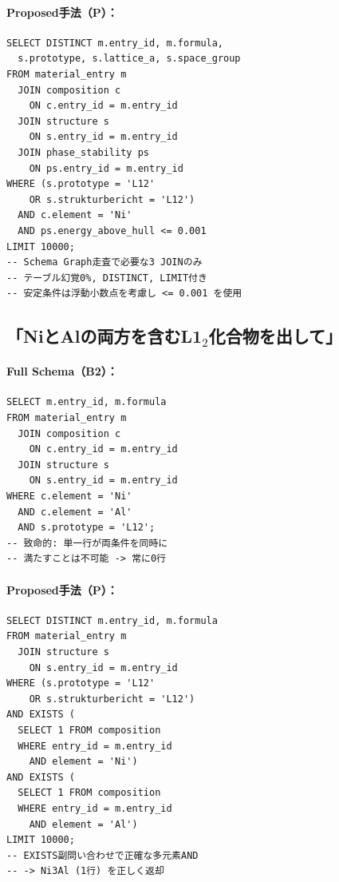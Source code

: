\documentclass[5p,twocolumn]{elsarticle}
\begin{document}
\paragraph{Proposed手法（P）：}
\begin{lstlisting}
SELECT DISTINCT m.entry_id, m.formula,
  s.prototype, s.lattice_a, s.space_group
FROM material_entry m
  JOIN composition c
    ON c.entry_id = m.entry_id
  JOIN structure s
    ON s.entry_id = m.entry_id
  JOIN phase_stability ps
    ON ps.entry_id = m.entry_id
WHERE (s.prototype = 'L12'
    OR s.strukturbericht = 'L12')
  AND c.element = 'Ni'
  AND ps.energy_above_hull <= 0.001
LIMIT 10000;
-- Schema Graph走査で必要な3 JOINのみ
-- テーブル幻覚0%, DISTINCT, LIMIT付き
-- 安定条件は浮動小数点を考慮し <= 0.001 を使用
\end{lstlisting}

\subsection{「NiとAlの両方を含むL1$_2$化合物を出して」}

\paragraph{Full Schema（B2）：}
\begin{lstlisting}
SELECT m.entry_id, m.formula
FROM material_entry m
  JOIN composition c
    ON c.entry_id = m.entry_id
  JOIN structure s
    ON s.entry_id = m.entry_id
WHERE c.element = 'Ni'
  AND c.element = 'Al'
  AND s.prototype = 'L12';
-- 致命的: 単一行が両条件を同時に
-- 満たすことは不可能 -> 常に0行
\end{lstlisting}

\paragraph{Proposed手法（P）：}
\begin{lstlisting}
SELECT DISTINCT m.entry_id, m.formula
FROM material_entry m
  JOIN structure s
    ON s.entry_id = m.entry_id
WHERE (s.prototype = 'L12'
    OR s.strukturbericht = 'L12')
AND EXISTS (
  SELECT 1 FROM composition
  WHERE entry_id = m.entry_id
    AND element = 'Ni')
AND EXISTS (
  SELECT 1 FROM composition
  WHERE entry_id = m.entry_id
    AND element = 'Al')
LIMIT 10000;
-- EXISTS副問い合わせで正確な多元素AND
-- -> Ni3Al (1行) を正しく返却
\end{lstlisting}

\end{document}
